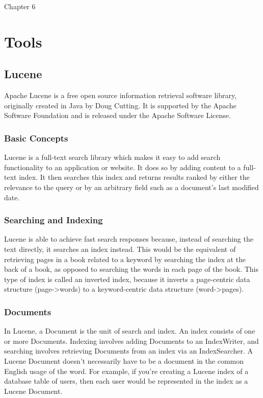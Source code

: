 Chapter 6

\chapter{Tools} %

\label{Chapter6} %



\section{Lucene}

Apache Lucene is a free open source information retrieval software library, originally created in Java by Doug Cutting. It is supported by the Apache Software Foundation and is released under the Apache Software License.
\subsection{Basic Concepts}
Lucene is a full-text search library which makes it easy to add search functionality to an application or website. It does so by adding content to a full-text index. It then searches this index and returns results ranked by either the relevance to the query or by an arbitrary field such as a document's last modified date.
\subsection{Searching and Indexing}
Lucene is able to achieve fast search responses because, instead of searching the text directly, it searches an index instead. This would be the equivalent of retrieving pages in a book related to a keyword by searching the index at the back of a book, as opposed to searching the words in each page of the book. This type of index is called an inverted index, because it inverts a page-centric data structure (page->words) to a keyword-centric data structure (word->pages).

\subsection{Documents}
In Lucene, a Document is the unit of search and index. An index consists of one or more Documents. Indexing involves adding Documents to an IndexWriter, and searching involves retrieving Documents from an index via an IndexSearcher. A Lucene Document doesn't necessarily have to be a document in the common English usage of the word. For example, if you're creating a Lucene index of a database table of users, then each user would be represented in the index as a Lucene Document.
